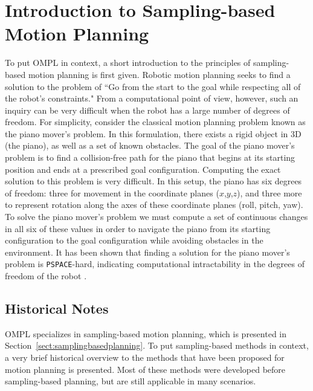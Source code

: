 \chapter{Introduction to Sampling-based Motion Planning}
\label{chp:motionplanning}

To put OMPL in context, a short introduction to the principles of
sampling-based motion planning is first given.  Robotic motion planning seeks
to find a solution to the problem of ``Go from the start to the goal while
respecting all of the robot's constraints."  From a computational point of view,
however, such an inquiry can be very difficult when the robot has a large
number of degrees of freedom.  For simplicity, consider the
classical motion planning problem known as the piano mover's problem.  In this
formulation, there exists a rigid object in 3D (the piano), as well as a set of
known obstacles.  The goal of the piano mover's problem is to find a
collision-free path for the piano that begins at its starting position and
ends at a prescribed goal configuration.  Computing the exact solution to
this problem is very difficult.  In this setup, the piano has six degrees of
freedom: three for movement in the coordinate planes ($x$,$y$,$z$), and three
more to represent rotation along the axes of these coordinate planes (roll,
pitch, yaw).  To solve the piano mover's problem we must compute a set of
continuous changes in all six of these values in order to navigate the piano
from its starting configuration to the goal configuration while avoiding
obstacles in the environment.  It has been shown that finding a solution for
the piano mover's problem is {\tt PSPACE}-hard, indicating computational
intractability in the degrees of freedom of the robot \cite{Latombe:1991,
Choset:2005, LaValle:2006}.

\section {Historical Notes}
OMPL specializes in sampling-based motion planning, which is presented in
Section~\ref {sect:samplingbasedplanning}.  To put sampling-based methods
in context, a very brief historical overview to the methods that have been 
proposed for motion planning is presented.  Most of these methods were developed
before sampling-based planning, but are still applicable in many scenarios.

